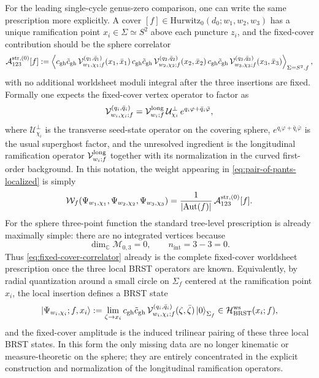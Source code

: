 \documentclass[11pt]{article}
\newcommand{\mc}[1]{\mathcal{#1}}
\newcommand{\bC}{\mathbb{C}}
\begin{document}
For the leading single-cycle genus-zero comparison, one can write the same prescription more explicitly. A cover $[f]\in \mathrm{Hurwitz}_0(d_0;w_1,w_2,w_3)$ has a unique ramification point $x_i\in \Sigma\simeq S^2$ above each puncture $z_i$, and the fixed-cover contribution should be the sphere correlator
\begin{equation}\label{eq:fixed-cover-correlator}
\mc A^{\rm str,(0)}_{123}[f]
:=
\left\langle
c_{\rm gh}\tilde c_{\rm gh}\,\mc V^{(q_1,\bar q_1)}_{w_1,\chi_1;f}(x_1,\bar x_1)\,
c_{\rm gh}\tilde c_{\rm gh}\,\mc V^{(q_2,\bar q_2)}_{w_2,\chi_2;f}(x_2,\bar x_2)\,
c_{\rm gh}\tilde c_{\rm gh}\,\mc V^{(q_3,\bar q_3)}_{w_3,\chi_3;f}(x_3,\bar x_3)
\right\rangle_{\Sigma=S^2,f},
\end{equation}
with no additional worldsheet moduli integral after the three insertions are fixed. Formally one expects the fixed-cover vertex operator to factor as
\begin{equation}\label{eq:fixed-cover-vertex-factorization}
\mc V^{(q_i,\bar q_i)}_{w_i,\chi_i;f}
=
\mc V^{\rm long}_{w_i;f}\,
\mc U^\perp_{\chi_i}\,
e^{q_i\varphi+\bar q_i\bar\varphi},
\end{equation}
where $\mc U^\perp_{\chi_i}$ is the transverse seed-state operator on the covering sphere, $e^{q_i\varphi+\bar q_i\bar\varphi}$ is the usual superghost factor, and the unresolved ingredient is the longitudinal ramification operator $\mc V^{\rm long}_{w_i;f}$ together with its normalization in the curved first-order background. In this notation, the weight appearing in \eqref{eq:pair-of-pants-localized} is simply
\begin{equation}\label{eq:fixed-cover-weight}
\mc W_f(\Psi_{w_1,\chi_1},\Psi_{w_2,\chi_2},\Psi_{w_3,\chi_3})
=
\frac{1}{|\mathrm{Aut}(f)|}\,
\mc A^{\rm str,(0)}_{123}[f].
\end{equation}
For the sphere three-point function the standard tree-level prescription is already maximally simple: there are no integrated vertices because
\begin{equation}\label{eq:sphere-three-point-no-moduli}
\dim_{\bC}\mc M_{0,3}=0,
\qquad
n_{\mathrm{int}}=3-3=0.
\end{equation}
Thus \eqref{eq:fixed-cover-correlator} already is the complete fixed-cover worldsheet prescription once the three local BRST operators are known. Equivalently, by radial quantization around a small circle on $\Sigma_f$ centered at the ramification point $x_i$, the local insertion defines a BRST state
\begin{equation}\label{eq:fixed-cover-local-state}
\left|\Psi_{w_i,\chi_i};f,x_i\right\rangle
:=
\lim_{\zeta\to x_i}
c_{\rm gh}\tilde c_{\rm gh}\,
\mc V^{(q_i,\bar q_i)}_{w_i,\chi_i;f}(\zeta,\bar\zeta)
\left|0\right\rangle_{\Sigma_f}
\in
\mc H_{\rm BRST}^{\rm ws}(x_i;f),
\end{equation}
and the fixed-cover amplitude is the induced trilinear pairing of these three local BRST states. In this form the only missing data are no longer kinematic or measure-theoretic on the sphere; they are entirely concentrated in the explicit construction and normalization of the longitudinal ramification operators.
\end{document}
